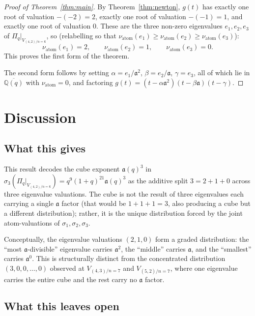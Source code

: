 \documentclass[11pt]{article}
\theoremstyle{plain}
\theoremstyle{definition}
\theoremstyle{remark}
\newcommand{\Q}{\mathbb{Q}}
\newcommand{\Pibs}{\Pi_q}
\newcommand{\val}{\nu_{\mathrm{atom}}}
\newcommand{\atom}{\mathfrak{a}}
\begin{document}
\begin{proof}[Proof of Theorem~\ref{thm:main}]
By Theorem~\ref{thm:newton}, $g(t)$ has exactly one root of valuation $-(-2)=2$,
exactly one root of valuation $-(-1)=1$, and exactly one root of valuation $0$.
These are the three non-zero eigenvalues $e_1, e_2, e_3$ of $\Pibs|_{V_{(4,2)/n=6}}$,
so (relabelling so that $\val(e_1) \geq \val(e_2) \geq \val(e_3)$):
\[ \val(e_1) = 2, \qquad \val(e_2) = 1, \qquad \val(e_3) = 0. \]
This proves the first form of the theorem.

The second form follows by setting $\alpha = e_1 / \atom^2$, $\beta = e_2 / \atom$,
$\gamma = e_3$, all of which lie in $\overline{\Q(q)}$ with $\val = 0$, and
factoring $g(t) = (t - \alpha\atom^2)(t - \beta\atom)(t - \gamma)$.
\end{proof}

\section{Discussion}

\subsection{What this gives}

This result decodes the cube exponent $\atom(q)^3$ in
$\sigma_3(\Pibs|_{V_{(4,2)/n=6}}) = q^9(1+q)^{21}\atom(q)^3$ as the additive split
$3 = 2 + 1 + 0$ across three eigenvalue valuations.  The cube is not the result of
three eigenvalues each carrying a single $\atom$ factor (that would be
$1 + 1 + 1 = 3$, also producing a cube but a different distribution); rather, it
is the unique distribution forced by the joint atom-valuations of $\sigma_1,
\sigma_2, \sigma_3$.

Conceptually, the eigenvalue valuations $(2,1,0)$ form a graded distribution: the
``most $\atom$-divisible'' eigenvalue carries $\atom^2$, the ``middle'' carries
$\atom$, and the ``smallest'' carries $\atom^0$.  This is structurally distinct
from the concentrated distribution $(3, 0, 0, \ldots, 0)$ observed at
$V_{(4,3)/n=7}$ and $V_{(5,2)/n=7}$, where one eigenvalue carries the entire cube
and the rest carry no $\atom$ factor.

\subsection{What this leaves open}
\end{document}
